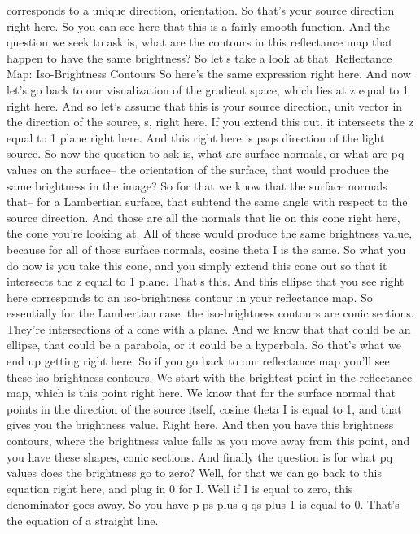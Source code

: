 \documentclass[12pt]{article}
\begin{document}
corresponds to a unique direction, orientation.
So that's your source direction right here.
So you can see here that this is a fairly smooth function.
And the question we seek to ask is,
what are the contours in this reflectance map that happen
to have the same brightness?
So let's take a look at that.
Reflectance Map: Iso-Brightness Contours
So here's the same expression right here.
And now let's go back to our visualization
of the gradient space, which lies at z equal to 1
right here.
And so let's assume that this is your source direction, unit
vector in the direction of the source, s, right here.
If you extend this out, it intersects the z equal to 1
plane right here.
And this right here is psqs direction of the light source.
So now the question to ask is, what are surface normals,
or what are pq values on the surface--
the orientation of the surface, that
would produce the same brightness in the image?
So for that we know that the surface normals that--
for a Lambertian surface, that subtend the same angle
with respect to the source direction.
And those are all the normals that lie on this cone right
here, the cone you're looking at.
All of these would produce the same brightness value,
because for all of those surface normals, cosine theta
I is the same.
So what you do now is you take this cone,
and you simply extend this cone out
so that it intersects the z equal to 1 plane.
That's this.
And this ellipse that you see right here
corresponds to an iso-brightness contour
in your reflectance map.
So essentially for the Lambertian case,
the iso-brightness contours are conic sections.
They're intersections of a cone with a plane.
And we know that that could be an ellipse, that
could be a parabola, or it could be a hyperbola.
So that's what we end up getting right here.
So if you go back to our reflectance map
you'll see these iso-brightness contours.
We start with the brightest point in the reflectance map,
which is this point right here.
We know that for the surface normal that
points in the direction of the source itself, cosine theta
I is equal to 1, and that gives you the brightness value.
Right here.
And then you have this brightness contours,
where the brightness value falls as you move away
from this point, and you have these shapes, conic sections.
And finally the question is for what pq values does
the brightness go to zero?
Well, for that we can go back to this equation right
here, and plug in 0 for I. Well if I is equal to zero,
this denominator goes away.
So you have p ps plus q qs plus 1 is equal to 0.
That's the equation of a straight line.
\end{document}
